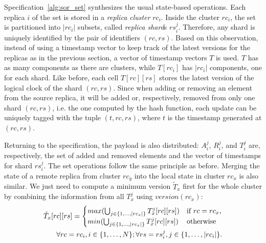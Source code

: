 \begin{algorithm}[t]
{
 }
\end{algorithm}

Specification~\ref{alg:sor_set} synthesizes the usual state-based operations.
Each replica $i$ of the set is stored in a \textit{replica cluster} $rc_{i}$.
Inside the cluster $rc_{i}$, the set is partitioned into $|rc_{i}|$ subsets,
called \textit{replica shard}s $rs_{i}^{j}$. Therefore, any shard is uniquely
identified by the pair of identifiers $(rc, rs)$. Based on this observation,
instead of using a timestamp vector to keep track of the latest versions for the
replicas as in the previous section, a vector of timestamp vectors $T$ is
used. $T$ has as many components as there are clusters, while $T[rc_{i}]$ has
$|rc_{i}|$ components, one for each shard. Like before, each cell $T[rc][rs]$
stores the latest version of the logical clock of the shard $(rc, rs)$. Since
when adding or removing an element from the source replica, it will be added or,
respectively, removed from only one shard $(rc, rs)$, i.e. the one computed by
the hash function, each update can be uniquely tagged with the tuple $(t, rc,
rs)$, where $t$ is the timestamp generated at $(rc, rs)$.

Returning to the specification, the payload is also distributed: $A_{i}^{j}$,
$R_{i}^{j}$, and $T_{i}^{j}$ are, respectively, the set of added and removed
elements and the vector of timestamps for shard $rs_{i}^{j}$. The set operations
follow the same principle as before. Merging the state of a remote replica from
cluster $rc_{y}$ into the local state in cluster $rc_{x}$ is also similar. We
just need to compute a minimum version $\tilde{T}_{x}$ first for the whole
cluster by combining the information from all $T_{x}^{j}$ using
$version(rc_{x})$:
\begin{align*}
\tilde{T}_{x}[rc][rs] = \begin{cases}
                            max (\bigcup_{j \in \{1,\ldots,|rc_{x}|\}} T_{x}^{j}[rc][rs]) & \text{if } rc = rc_{x}, \\
                            min (\bigcup_{j \in \{1,\ldots,|rc_{x}|\}} T_{x}^{j}[rc][rs]) & \text{otherwise}
                        \end{cases}
\\
\hfill \forall rc = rc_{i}, i \in \{1,\ldots,N\}; \forall rs = rs_{i}^{j}, j \in \{1,\ldots,|rc_{i}|\}.
\end{align*}
\normalsize

